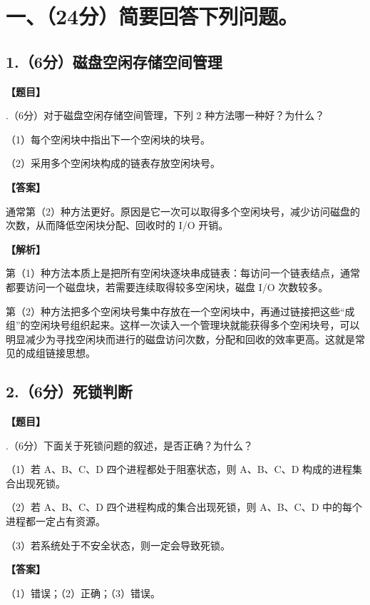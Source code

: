 \documentclass[UTF8,12pt]{ctexart}
\newenvironment{question}{\par\medskip\noindent\textbf{【题目】}\par\smallskip}{\par\medskip}
\newenvironment{explanation}{\par\noindent\textbf{【解析】}\par\smallskip}{\par\medskip}
\newenvironment{answer}{\par\noindent\textbf{【答案】}\par\smallskip}{\par}
\begin{document}
\section*{一、（24分）简要回答下列问题。}

\subsection*{1.（6分）磁盘空闲存储空间管理}
\begin{question}
1.（6分）对于磁盘空闲存储空间管理，下列 2 种方法哪一种好？为什么？

（1）每个空闲块中指出下一个空闲块的块号。

（2）采用多个空闲块构成的链表存放空闲块号。
\end{question}

\begin{answer}
通常第（2）种方法更好。原因是它一次可以取得多个空闲块号，减少访问磁盘的次数，从而降低空闲块分配、回收时的 I/O 开销。
\end{answer}

\begin{explanation}
第（1）种方法本质上是把所有空闲块逐块串成链表：每访问一个链表结点，通常都要访问一个磁盘块，若需要连续取得较多空闲块，磁盘 I/O 次数较多。

第（2）种方法把多个空闲块号集中存放在一个空闲块中，再通过链接把这些“成组”的空闲块号组织起来。这样一次读入一个管理块就能获得多个空闲块号，可以明显减少为寻找空闲块而进行的磁盘访问次数，分配和回收的效率更高。这就是常见的成组链接思想。
\end{explanation}

\subsection*{2.（6分）死锁判断}
\begin{question}
2.（6分）下面关于死锁问题的叙述，是否正确？为什么？

（1）若 A、B、C、D 四个进程都处于阻塞状态，则 A、B、C、D 构成的进程集合出现死锁。

（2）若 A、B、C、D 四个进程构成的集合出现死锁，则 A、B、C、D 中的每个进程都一定占有资源。

（3）若系统处于不安全状态，则一定会导致死锁。
\end{question}

\begin{answer}
（1）错误；（2）正确；（3）错误。
\end{answer}
\end{document}
